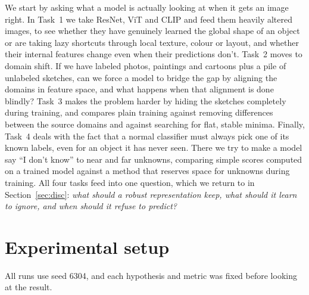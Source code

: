 \documentclass{article}
\begin{document}
We start by asking what a model is actually looking at when it gets an image right. In Task~1 we take ResNet, ViT and CLIP and feed them heavily altered images, to see whether they have genuinely learned the global shape of an object or are taking lazy shortcuts through local texture, colour or layout, and whether their internal features change even when their predictions don't. Task~2 moves to domain shift. If we have labeled photos, paintings and cartoons plus a pile of unlabeled sketches, can we force a model to bridge the gap by aligning the domains in feature space, and what happens when that alignment is done blindly? Task~3 makes the problem harder by hiding the sketches completely during training, and compares plain training against removing differences between the source domains and against searching for flat, stable minima. Finally, Task~4 deals with the fact that a normal classifier must always pick one of its known labels, even for an object it has never seen. There we try to make a model say ``I don't know'' to near and far unknowns, comparing simple scores computed on a trained model against a method that reserves space for unknowns during training. All four tasks feed into one question, which we return to in Section~\ref{sec:disc}: \emph{what should a robust representation keep, what should it learn to ignore, and when should it refuse to predict?}

\section{Experimental setup}\label{sec:setup}
All runs use seed 6304, and each hypothesis and metric was fixed before looking at the result.
\end{document}
